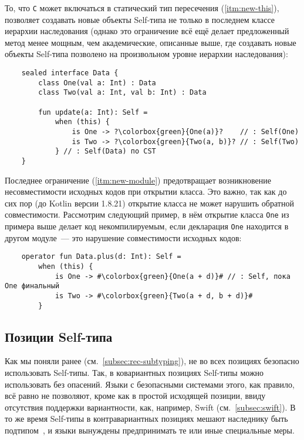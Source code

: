То, что \texttt{C} может включаться в статический тип пересечения (\ref{itm:new-this}), позволяет создавать новые объекты Self-типа не только в последнем классе иерархии наследования (однако это ограничение всё ещё делает предложенный метод менее мощным, чем академические, описанные выше, где создавать новые объекты Self-типа позволено на произвольном уровне иерархии наследования):

\begin{verbatim}
    sealed interface Data {
        class One(val a: Int) : Data
        class Two(val a: Int, val b: Int) : Data

        fun update(a: Int): Self =
            when (this) {
                is One -> ?\colorbox{green}{One(a)}?    // : Self(One)
                is Two -> ?\colorbox{green}{Two(a, b)}? // : Self(Two)
            } // : Self(Data) по CST
    }
\end{verbatim}

Последнее ограничение (\ref{itm:new-module}) предотвращает возникновение несовместимости исходных кодов при открытии класса.
Это важно, так как до сих пор (до Kotlin версии 1.8.21) открытие класса не может нарушить обратной совместимости.
Рассмотрим следующий пример, в нём открытие класса \texttt{One} из примера выше делает код некомпилируемым, если декларация \texttt{One} находится в другом модуле~--- это нарушение совместимости исходных кодов:

\begin{verbatim}
    operator fun Data.plus(d: Int): Self =
        when (this) {
            is One -> #\colorbox{green}{One(a + d)}# // : Self, пока One финальный
            is Two -> #\colorbox{green}{Two(a + d, b + d)}#
        }
\end{verbatim}


\subsection{Позиции Self-типа} \label{subsec:self-positions}

Как мы поняли ранее (см.~\ref{subsec:rec-subtyping}), не во всех позициях безопасно использовать Self-типы.
Так, в ковариантных позициях Self-типы можно использовать без опасений.
Языки с безопасными системами этого, как правило, всё равно не позволяют, кроме как в простой исходящей позиции, ввиду отсутствия поддержки вариантности, как, например, Swift (см.~\ref{subsec:swift}).
В то же время Self-типы в контравариантных позициях мешают наследнику быть подтипом~\cite{cook1989inheritance}, и языки вынуждены предпринимать те или иные специальные меры.

